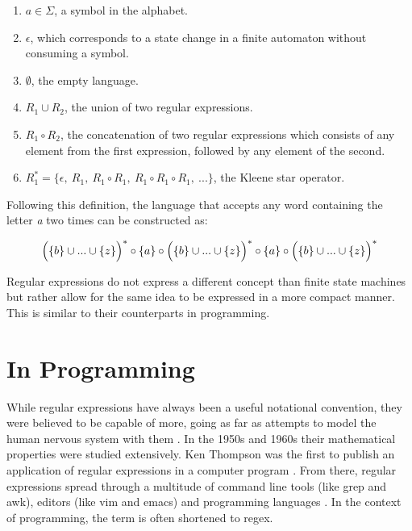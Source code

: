 \begin{enumerate}
    \item $a \in \Sigma$, a symbol in the alphabet. \label{defRegexSymbol}
    \item $\epsilon$, which corresponds to a state change in a finite automaton without consuming a symbol. \label{defRegexEpsilon}
    \item $\emptyset$, the empty language. \label{defRegexEmptyLang}
    \item $R_1 \cup R_2$, the union of two regular expressions. \label{defRegexUnion}
    \item $R_1 \circ R_2$, the concatenation of two regular expressions which consists of any element from the first expression, followed by any element of the second. \label{defRegexConcat}
    \item $R_1^* = \{ \epsilon,\ R_1,\ R_1 \circ R_1,\ R_1 \circ R_1 \circ R_1,\  ... \}$, the Kleene star operator.\label{defRegexKleene}
\end{enumerate}

Following this definition, the language that accepts any word containing the letter \emph{a} two times can be constructed as:

\begin{equation*}
    \Bigl ( \{b\} \cup ... \cup \{z\} \Bigr )^*\circ\{a\} \circ \Bigl ( \{b\} \cup ... \cup \{z\} \Bigr )^*\circ\{a\} \circ \Bigl ( \{b\} \cup ... \cup \{z\} \Bigr )^*
\end{equation*}

Regular expressions do not express a different concept than finite state machines but rather allow for the same idea to be expressed in a more compact manner. This is similar to their counterparts in programming.

\section{In Programming}

While regular expressions have always been a useful notational convention, they were believed to be capable of more, going as far as attempts to model the human nervous system with them \cite[p.~85~ff]{MasteringRegex}. In the 1950s and 1960s their mathematical properties were studied extensively. Ken Thompson was the first to publish an application of regular expressions in a computer program \cite{RegularExpressionSearchAlgorithm}. From there, regular expressions spread through a multitude of command line tools (like grep and awk), editors (like vim and emacs) and programming languages \cite[p.~85]{MasteringRegex}. In the context of programming, the term is often shortened to regex.

